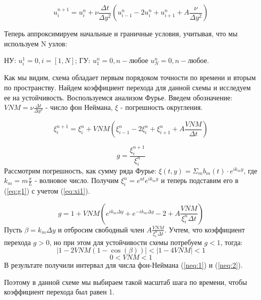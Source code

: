 \begin{equation}
    u_i^{n+1}=u_i^n+\nu \frac{\Delta t}{\Delta y^2} (u_{i-1}^n-2u_i^n+u^n_{i+1}+A\frac{\nu}{\Delta y^2})
\end{equation}

Теперь аппроксимируем начальные и граничные условия, учитывая, что мы используем N узлов:

НУ: $u^1_i = 0, i=[1,N]$; ГУ: $u^n_1 = 0, n - \text{любое} $ $u^n_N = 0, n - \text{любое}$.

Как мы видим, схема обладает первым порядоком точности по времени и вторым по пространству. Найдем коэффициент перехода для данной схемы и исследуем ее на устойчивость. Воспользуемся анализом Фурье. Введем обозначение: $VNM=\nu\frac{\Delta t}{\Delta y^2}$ - число фон Неймана, $\xi$ - погрешность округления.

\begin{equation}
    \xi_i^{n+1}=\xi^n_i+VNM(\xi_{i-1}^n-2\xi_i^n+\xi^n_{i+1}+A\frac{VNM}{\Delta t})
    \label{eq:xi1}
\end{equation}

\begin{equation}
    g=\frac{\xi_i^{n+1}}{\xi_i^{n}}
    \label{eq:g1}
\end{equation}
Рассмотрим погрешность, как сумму ряда Фурье: $\xi(t,y)=\Sigma_m b_m(t)\cdot e^{ik_my}$, где $k_m=m\frac{\pi}{L}$ - волновое число. Получим $\xi_i^n=e^{at}e^{ik_my}$ и теперь подставим его в (\ref{eq:g1}) с учетом (\ref{eq:xi1}).

\begin{equation}
    g=1+VNM(e^{ik_m\Delta y}+e^{-ik_m\Delta y}-2+A\frac{VNM}{\xi_i^{n}\Delta t})
\end{equation}
Пусть $\beta=k_m\Delta y$ и отбросим свободный член $A\frac{VNM}{\xi_i^{n}\Delta t}$. Учтем, что коэффициент перехода $g>0$, но при этом для устойчивости схемы потребуем $g<1$, тогда:
\begin{equation}
    |1-2VNM(1-\cos(\beta))|<|1-4VNM|<1
    \label{neq:1}
\end{equation}
\begin{equation}
    0<VNM<1
    \label{neq:2}
\end{equation}
В результате получили интервал для числа фон-Неймана (\ref{neq:1}) и (\ref{neq:2}).

Поэтому в данной схеме мы выбираем такой масштаб шага по времени, чтобы коэффициент перехода был равен 1.

